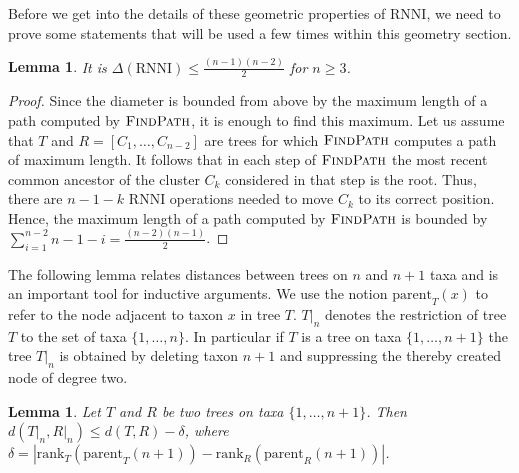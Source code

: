 \documentclass{amsart}
\newcommand{\parent}{\mathrm{parent}}
\newcommand{\rank}{\mathrm{rank}}
\newcommand{\rnni}{\mathrm{RNNI}}
\newcommand{\findpath}{\textsc{FindPath}}
\newtheorem{lemma}[definition]{Lemma}
\begin{document}
Before we get into the details of these geometric properties of $\rnni$, we need to prove some statements that will be used a few times within this geometry section.

\begin{lemma}
It is $\Delta(\rnni) \leq \frac{(n-1)(n-2)}{2}$ for $n \geq 3$.
\label{lemma:diameter_bound}
\end{lemma}

\begin{proof}
Since the diameter is bounded from above by the maximum length of a path computed by $\findpath$, it is enough to find this maximum.
Let us assume that $T$ and $R = [C_1, \ldots, C_{n-2}]$ are trees for which $\findpath$ computes a path of maximum length.
It follows that in each step of $\findpath$ the most recent common ancestor of the cluster $C_k$ considered in that step is the root.
Thus, there are $n-1-k$ $\rnni$ operations needed to move $C_k$ to its correct position.
Hence, the maximum length of a path computed by $\findpath$ is bounded by $\sum\limits_{i = 1}^{n-2} n-1-i = \frac{(n-2)(n-1)}{2}$.
\end{proof}

The following lemma relates distances between trees on $n$ and $n+1$ taxa and is an important tool for inductive arguments.
We use the notion $\parent_T(x)$ to refer to the node adjacent to taxon $x$ in tree $T$.
$T{\big|}_n$ denotes the restriction of tree $T$ to the set of taxa $\{1, \ldots, n\}$.
In particular if $T$ is a tree on taxa $\{1, \ldots, n+1\}$ the tree $T{\big|}_n$ is obtained by deleting taxon $n+1$ and suppressing the thereby created node of degree two.

\begin{lemma}
Let $T$ and $R$ be two trees on taxa $\{1, \ldots, n+1\}$.
Then $d(T{\big|}_n, R{\big|}_n) \leq d(T,R) - \delta$, where $\delta = |\rank_T(\parent_T(n+1)) - \rank_R(\parent_R(n+1))|$.
\label{lemma:distance_delete_taxon}
\end{lemma}
\end{document}
